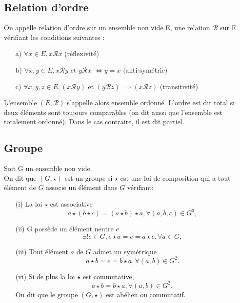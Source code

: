 \subsection{Relation d'ordre}
\begin{madefinition}
	On appelle relation d’ordre sur un ensemble non vide E, une relation
	$\mathcal{R}$ sur E vérifiant les conditions suivantes :
	\begin{enumerate}
		\item[a)] $\forall x \in E, x\mathcal{R}x$ (réflexivité)
		\item[b)] $\forall x,y \in E, x\mathcal{R}y $ et $y\mathcal{R}x$ $ \Longleftrightarrow y = x $ (anti-symétrie)
		\item[c)] $\forall x,y,z \in E, (x\mathcal{R}y)$ et $(y\mathcal{R}z)$ $\Longrightarrow (x\mathcal{R}z)$  (transitivité)
	\end{enumerate}
	L'ensemble $(E, \mathcal{R})$ s'appelle alors ensemble ordonné. L'ordre est dit total si deux éléments sont toujours comparables (on dit aussi que l'ensemble est totalement ordonné). Dans le cas contraire, il est dit partiel.
\end{madefinition}

\subsection{Groupe}
\begin{madefinition}
	Soit G un ensemble non vide.\\
	On dit que $(G, \star)$ est un groupe si $\star$ est une loi de composition qui a tout élément de $G$ associe un élément dans $G$ vérifiant:
	\begin{enumerate}
		\item[(i)] La loi $\star$ est associative 
		\[ a\star(b\star c) = (a\star b) \star a, \forall (a,b,c) \in G^3,\]
		\item[(ii)] G possède un élément neutre $e$
		\[ \exists!e \in G, e\star a = e =  a\star e, \forall a \in G,\]
		\item[(iii)] Tout élément $a$ de $G$ admet un symétrique
		\[ a\star b = e = b \star a, \forall (a,b) \in G^2.\]
		\item [(vi)] Si de plus la loi $\star$ est commutative, 
		\[ a\star b = b \star a, \forall (a,b) \in G^2,\]
		On dit que le groupe $(G,\star)$ est abélien ou commutatif.
	\end{enumerate}
\end{madefinition}
